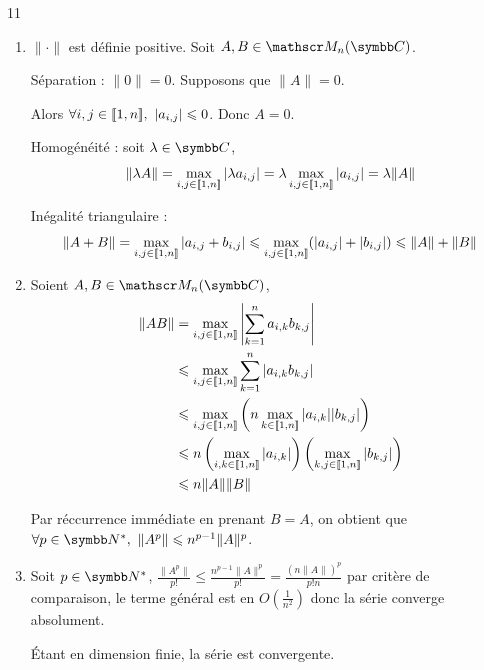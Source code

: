 \begin{correction}{11}
\begin{enumerate}
    \item $\|\cdot\|$ est définie positive.
    Soit $A,B \in \mathscr M_n(\C)$.

    Séparation : $\|0\| = 0$. Supposons que $\|A\| = 0$.

    Alors $\forall i,j \in [\![1, n]\!],~|a_{i,j}| \leqslant 0$. Donc $A = 0$.
    
    Homogénéité : soit $\lambda \in \C$,
    \[\|\lambda A\| = \max_{i,j \in [\![1, n]\!]} |\lambda a_{i,j}| = \lambda \max_{i,j \in [\![1, n]\!]} |a_{i,j}| = \lambda \|A\|\]

    Inégalité triangulaire :
    \[\|A + B\| = \max_{i,j \in [\![1, n]\!]} |a_{i,j} + b_{i,j}| \leqslant \max_{i,j \in [\![1, n]\!]} (|a_{i,j}| + |b_{i,j}|) \leqslant \|A\| + \|B\|\]

    \item Soient $A,B \in \mathscr M_n(\C)$,
    \begin{align*}
        \|AB\| &= \max_{i,j \in \ninter 1 n} \left|\sum_{k=1}^n a_{i,k} b_{k,j}\right| \\
               &\leqslant \max_{i,j \in \ninter 1 n} \sum_{k=1}^n |a_{i,k} b_{k,j}| \\
               &\leqslant \max_{i,j \in \ninter 1 n}\left(n \max_{k \in \ninter 1 n} |a_{i,k}| |b_{k,j}|\right) \\
               &\leqslant n \left(\max_{i,k \in \ninter 1 n} |a_{i,k}|\right) \left(\max_{k,j \in \ninter 1 n} |b_{k,j}|\right) \\
               &\leqslant n \|A\| \|B\|
    \end{align*}

    Par réccurrence immédiate en prenant $B = A$, on obtient que $\forall p \in \N^*,~\|A^p\| \leqslant n^{p-1}\|A\|^p$.

    \item Soit $p \in \N^*$,
    $\frac {\|A^p\|} {p!} \leqslant \frac {n^{p-1}\|A\|^p} {p!} = \frac {(n\|A\|)^p} {p!n}$
    par critère de comparaison, le terme général est en $O\left(\frac 1 {n^2}\right)$ donc la série converge absolument.

    Étant en dimension finie, la série est convergente.
\end{enumerate}
\end{correction}

